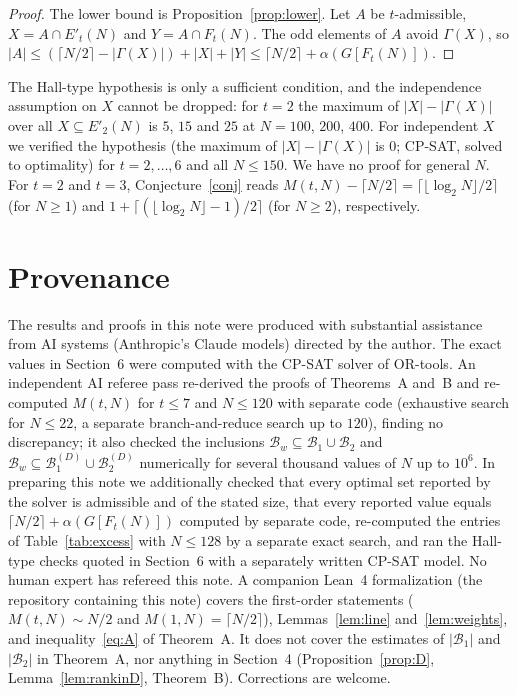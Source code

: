 \documentclass[11pt]{amsart}
\theoremstyle{definition}
\theoremstyle{remark}
\newcommand{\Bad}{\mathcal{B}}
\begin{document}
\begin{proof}
The lower bound is Proposition~\ref{prop:lower}. Let $A$ be $t$-admissible, $X=A\cap E'_t(N)$ and $Y=A\cap F_t(N)$. The odd elements of $A$ avoid $\Gamma(X)$, so $|A|\le(\lceil N/2\rceil-|\Gamma(X)|)+|X|+|Y|\le\lceil N/2\rceil+\alpha(G[F_t(N)])$.
\end{proof}

The Hall-type hypothesis is only a sufficient condition, and the independence assumption on $X$ cannot be dropped: for $t=2$ the maximum of $|X|-|\Gamma(X)|$ over all $X\subseteq E'_2(N)$ is $5$, $15$ and $25$ at $N=100$, $200$, $400$. For independent $X$ we verified the hypothesis (the maximum of $|X|-|\Gamma(X)|$ is $0$; CP-SAT, solved to optimality) for $t=2,\dots,6$ and all $N\le150$. We have no proof for general $N$. For $t=2$ and $t=3$, Conjecture~\ref{conj} reads $M(t,N)-\lceil N/2\rceil=\lceil\lfloor\log_2N\rfloor/2\rceil$ (for $N\ge1$) and $1+\lceil(\lfloor\log_2N\rfloor-1)/2\rceil$ (for $N\ge2$), respectively.

\section{Provenance}\label{sec:prov}

The results and proofs in this note were produced with substantial assistance from AI systems (Anthropic's Claude models) directed by the author. The exact values in Section~6 were computed with the CP-SAT solver of OR-tools. An independent AI referee pass re-derived the proofs of Theorems~A and~B and re-computed $M(t,N)$ for $t\le7$ and $N\le120$ with separate code (exhaustive search for $N\le22$, a separate branch-and-reduce search up to $120$), finding no discrepancy; it also checked the inclusions $\Bad_w\subseteq\Bad_1\cup\Bad_2$ and $\Bad_w\subseteq\Bad_1^{(D)}\cup\Bad_2^{(D)}$ numerically for several thousand values of $N$ up to $10^6$. In preparing this note we additionally checked that every optimal set reported by the solver is admissible and of the stated size, that every reported value equals $\lceil N/2\rceil+\alpha(G[F_t(N)])$ computed by separate code, re-computed the entries of Table~\ref{tab:excess} with $N\le128$ by a separate exact search, and ran the Hall-type checks quoted in Section~6 with a separately written CP-SAT model. No human expert has refereed this note. A companion Lean~4 formalization (the repository containing this note) covers the first-order statements ($M(t,N)\sim N/2$ and $M(1,N)=\lceil N/2\rceil$), Lemmas~\ref{lem:line} and~\ref{lem:weights}, and inequality~\eqref{eq:A} of Theorem~A. It does not cover the estimates of $|\mathcal B_1|$ and $|\mathcal B_2|$ in Theorem~A, nor anything in Section~4 (Proposition~\ref{prop:D}, Lemma~\ref{lem:rankinD}, Theorem~B). Corrections are welcome.
\end{document}
